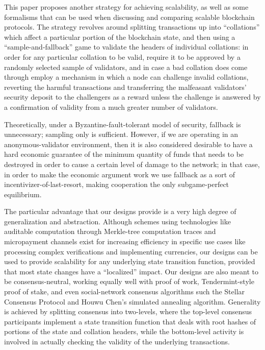 \documentclass[11pt,a4paper]{article}
\theoremstyle{plain}
\theoremstyle{definition}
\theoremstyle{remark}
\begin{document}
This paper proposes another strategy for achieving scalability, as well as some formalisms that can be used when discussing and comparing scalable blockchain protocols. The strategy revolves around splitting transactions up into ``collations'' which affect a particular portion of the blockchain state, and then using a ``sample-and-fallback'' game to validate the headers of individual collations: in order for any particular collation to be valid, require it to be approved by a randomly selected sample of validators, and in case a bad collation does come through employ a mechanism in which a node can challenge invalid collations, reverting the harmful transactions and transferring the malfeasant validators' security deposit to the challengers as a reward unless the challenge is answered by a confirmation of validity from a much greater number of validators.

Theoretically, under a Byzantine-fault-tolerant model of security, fallback is unnecessary; sampling only is sufficient. However, if we are operating in an anonymous-validator environment, then it is also considered desirable to have a hard economic guarantee of the minimum quantity of funds that needs to be destroyed in order to cause a certain level of damage to the network; in that case, in order to make the economic argument work we use fallback as a sort of incentivizer-of-last-resort, making cooperation the only subgame-perfect equilibrium.

The particular advantage that our designs provide is a very high degree of generalization and abstraction. Although schemes using technologies like auditable computation through Merkle-tree computation traces\cite{versum} and micropayment channels\cite{lightning} exist for increasing efficiency in specific use cases like processing complex verifications and implementing currencies, our designs can be used to provide scalability for any underlying state transition function, provided that most state changes have a ``localized'' impact. Our designs are also meant to be consensus-neutral, working equally well with proof of work, Tendermint-style\cite{tendermint} proof of stake, and even social-network consensus algorithms such the Stellar Consensus Protocol\cite{stellar} and Houwu Chen's simulated annealing algorithm\cite{chenhouwu}. Generality is achieved by splitting consensus into two-levels, where the top-level consensus participants implement a state transition function that deals with root hashes of portions of the state and collation headers, while the bottom-level activity is involved in actually checking the validity of the underlying transactions.
\end{document}
